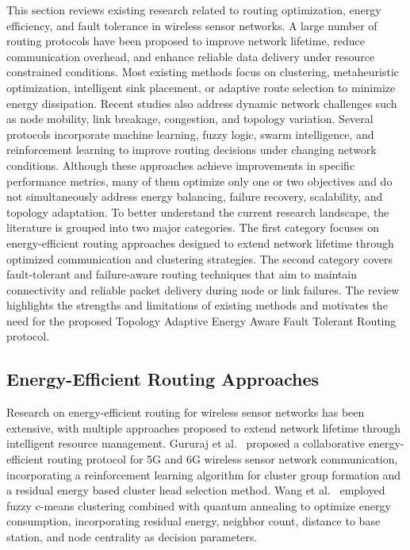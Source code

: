 \documentclass[a4paper,fleqn]{cas-dc}
\numberwithin{equation}{section}
\begin{document}
This section reviews existing research related to routing optimization, energy efficiency, and fault tolerance in wireless sensor networks. A large number of routing protocols have been proposed to improve network lifetime, reduce communication overhead, and enhance reliable data delivery under resource constrained conditions. Most existing methods focus on clustering, metaheuristic optimization, intelligent sink placement, or adaptive route selection to minimize energy dissipation. Recent studies also address dynamic network challenges such as node mobility, link breakage, congestion, and topology variation. Several protocols incorporate machine learning, fuzzy logic, swarm intelligence, and reinforcement learning to improve routing decisions under changing network conditions. Although these approaches achieve improvements in specific performance metrics, many of them optimize only one or two objectives and do not simultaneously address energy balancing, failure recovery, scalability, and topology adaptation. To better understand the current research landscape, the literature is grouped into two major categories. The first category focuses on energy-efficient routing approaches designed to extend network lifetime through optimized communication and clustering strategies. The second category covers fault-tolerant and failure-aware routing techniques that aim to maintain connectivity and reliable packet delivery during node or link failures. The review highlights the strengths and limitations of existing methods and motivates the need for the proposed Topology Adaptive Energy Aware Fault Tolerant Routing protocol.
\subsection{Energy-Efficient Routing Approaches}

Research on energy-efficient routing for wireless sensor networks has been extensive, with multiple approaches proposed to extend network lifetime through intelligent resource management. Gururaj et al.~\cite{gururaj2023collaborative} proposed a collaborative energy-efficient routing protocol for 5G and 6G wireless sensor network communication, incorporating a reinforcement learning algorithm for cluster group formation and a residual energy based cluster head selection method. Wang et al.~\cite{wang2024energy} employed fuzzy c-means clustering combined with quantum annealing to optimize energy consumption, incorporating residual energy, neighbor count, distance to base station, and node centrality as decision parameters.
 
\end{document}
